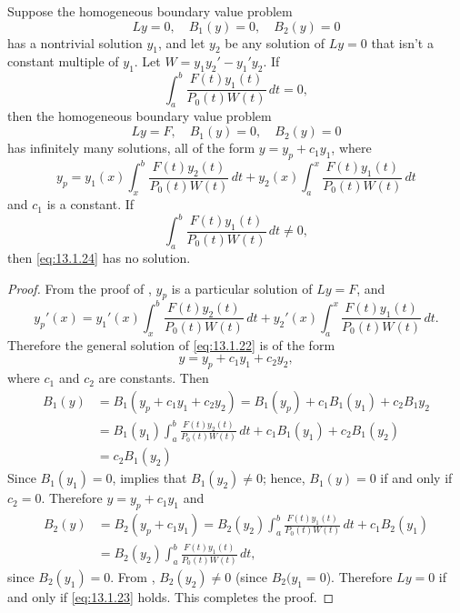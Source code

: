 \begin{theorem}\label{thmtype:13.1.4}
Suppose the homogeneous boundary value problem
\begin{equation} \label{eq:13.1.22}
Ly=0,\quad B_{1}(y)=0,\quad B_{2}(y)=0
\end{equation}
has a nontrivial solution $y_{1}$,  and let $y_{2}$ be  any solution of
$Ly=0$ that isn't  a constant multiple of $y_{1}$.  Let
$W=y_{1}y_{2}'-y_{1}'y_{2}$. If
\begin{equation} \label{eq:13.1.23}
\int_{a}^{b}\frac{F(t)y_{1}(t)}{P_{0}(t)W(t)}\,dt=0,
\end{equation}
then the homogeneous boundary value problem
\begin{equation} \label{eq:13.1.24}
Ly=F, \quad B_{1}(y)=0,\quad B_{2}(y)=0
\end{equation}
has infinitely many solutions, all of the form $y=y_{p}+c_{1}y_{1}$,
where
\[
y_{p}=y_{1}(x)
\int_{x}^{b}\frac{F(t)y_{2}(t)}{P_{0}(t)W(t)}\,dt+
y_{2}(x)
\int_{a}^{x}\frac{F(t)y_{1}(t)}{P_{0}(t)W(t)}\,dt
\]
and $c_{1}$ is a constant. If
\[
\int_{a}^{b}\frac{F(t)y_{1}(t)}{P_{0}(t)W(t)}\,dt \ne0,
\]
then \eqref{eq:13.1.24}  has no solution.
\end{theorem}

\begin{proof}
From the proof of , $y_{p}$ is a particular solution
of $Ly=F$,
and
\[
y_{p}'(x)=y_{1}'(x)\int_{x}^{b}\frac{F(t)y_{2}(t)}{P_{0}(t)W(t)}\,dt
+y_{2}'(x)\int_{a}^{x}\frac{F(t)y_{1}(t)}{P_{0}(t)W(t)}\,dt.
\]
Therefore the general solution of \eqref{eq:13.1.22} is of the form
\[
y=y_{p}+c_{1}y_{1}+c_{2}y_{2},
\]
where $c_{1}$ and $c_{2}$  are constants.  Then
\begin{align*}
B_{1}(y)&=
B_{1}(y_{p}+c_{1}y_{1}+c_{2}y_{2})=
B_{1}(y_{p})+c_{1}B_{1}(y_{1})+c_{2}B_{1}y_{2}\\
&=B_{1}(y_{1})\int_{a}^{b}\frac{F(t)y_{2}(t)}{P_{0}(t)W(t)}\,dt
+c_{1}B_{1}(y_{1})+c_{2}B_{1}(y_{2})\\
&=c_{2}B_{1}(y_{2})
\end{align*}
Since $B_{1}(y_{1})=0$,  implies that
$B_{1}(y_{2})\ne0$; hence, $B_{1}(y)=0$ if and only if $c_{2}=0$.
Therefore $y=y_{p}+c_{1}y_{1}$ and
\begin{align*}
B_{2}(y)&=B_{2}(y_{p}+c_{1}y_{1})
=B_{2}(y_{2})\int_{a}^{b}\frac{F(t)y_{1}(t)}{P_{0}(t)W(t)}\,dt+c_{1}B_{2}(y_{1})\\
&=B_{2}(y_{2})\int_{a}^{b}\frac{F(t)y_{1}(t)}{P_{0}(t)W(t)}\,dt,
\end{align*}
since $B_{2}(y_{1})=0$.  From ,
$B_{2}(y_{2})\ne0$ (since $B_{2}(y_{1}=0$).
Therefore $Ly=0$   if and only if  \eqref{eq:13.1.23} holds.
This completes the proof.
\end{proof}


